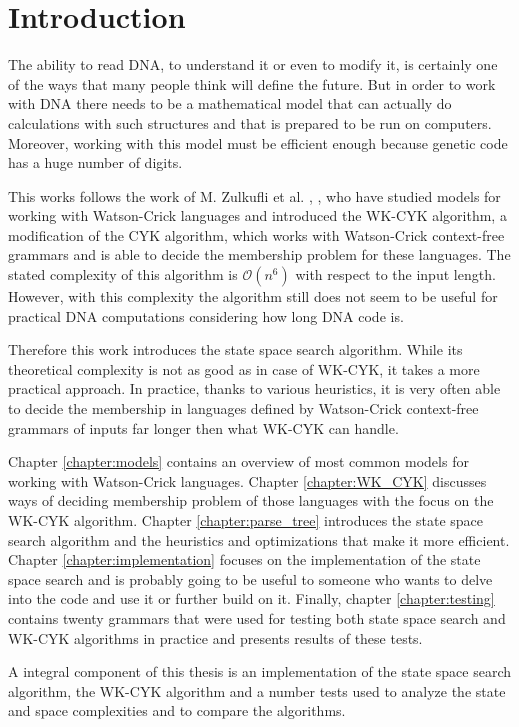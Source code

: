 \chapter{Introduction}

The ability to read DNA, to understand it or even to modify it, is certainly one of the ways that many people think will define the future. But in order to work with DNA there needs to be a mathematical model that can actually do calculations with such structures and that is prepared to be run on computers. Moreover, working with this model must be efficient enough because genetic code has a huge number of digits.

This works follows the work of M. Zulkufli et al. \cite{WK_GRAMMARS_1}, \cite{WK_GRAMMARS_2}, \cite{WK_CYK} who have studied models for working with Watson-Crick languages and introduced the WK-CYK algorithm, a modification of the CYK algorithm, which works with Watson-Crick context-free grammars and is able to decide the membership problem for these languages. The stated complexity of this algorithm is $\mathcal{O}(n^6)$ with respect to the input length. However, with this complexity the algorithm still does not seem to be useful for practical DNA computations considering how long DNA code is.

Therefore this work introduces the state space search algorithm. While its theoretical complexity is not as good as in case of WK-CYK, it takes a more practical approach. In practice, thanks to various heuristics, it is very often able to decide the membership in languages defined by Watson-Crick context-free grammars of inputs far longer then what WK-CYK can handle.

Chapter \ref{chapter:models} contains an overview of most common models for working with Watson-Crick languages. Chapter \ref{chapter:WK_CYK} discusses ways of deciding membership problem of those languages with the focus on the WK-CYK algorithm. Chapter \ref{chapter:parse_tree} introduces the state space search algorithm and the heuristics and optimizations that make it more efficient. Chapter \ref{chapter:implementation} focuses on the implementation of the state space search and is probably going to be useful to someone who wants to delve into the code and use it or further build on it. Finally, chapter \ref{chapter:testing} contains twenty grammars that were used for testing both state space search and WK-CYK algorithms in practice and presents results of these tests.

A integral component of this thesis is an implementation of the state space search algorithm, the WK-CYK algorithm and a number tests used to analyze the state and space complexities and to compare the algorithms.

